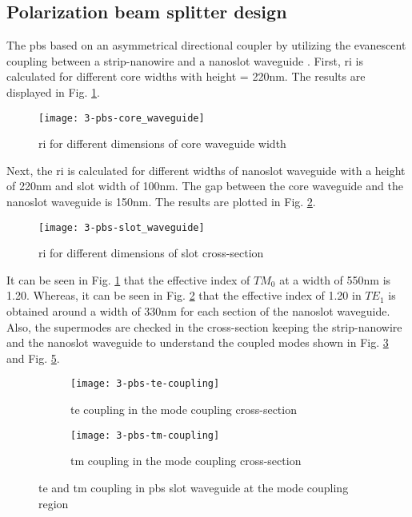 \documentclass[../report.tex]{subfiles}
\begin{document}
\subsection{Polarization beam splitter design}
The \gls{pbs} based on an asymmetrical directional coupler by utilizing the evanescent coupling between a strip-nanowire and a nanoslot waveguide \cite{pbs_dai_2011}. First, \gls{ri} is calculated for different core widths with height = 220nm. The results are displayed in Fig. \ref{fig:3_pbs_core_waveguide}.
\begin{figure}[H] %
	\centering
	\texttt{[image: 3-pbs-core\_waveguide]}
	\caption{\gls{ri} for different dimensions of core waveguide width}
	\label{fig:3_pbs_core_waveguide}
\end{figure}
\noindent Next, the \gls{ri} is calculated for different widths of nanoslot waveguide with a height of 220nm and slot width of 100nm. The gap between the core waveguide and the nanoslot waveguide is 150nm. The results are plotted in Fig. \ref{fig:3_pbs_slot_waveguide}.
\begin{figure}[H] %
	\centering
	\texttt{[image: 3-pbs-slot\_waveguide]}
	\caption{\gls{ri} for different dimensions of slot cross-section}
	\label{fig:3_pbs_slot_waveguide}
\end{figure}
\noindent It can be seen in Fig. \ref{fig:3_pbs_core_waveguide} that the effective index of $TM_0$ at a width of 550nm is 1.20. Whereas, it can be seen in Fig. \ref{fig:3_pbs_slot_waveguide} that the effective index of 1.20 in $TE_1$ is obtained around a width of 330nm for each section of the nanoslot waveguide. Also, the supermodes are checked in the cross-section keeping the strip-nanowire and the nanoslot waveguide to understand the coupled modes shown in Fig. \ref{fig:3_pbs_te_coupling} and Fig. \ref{fig:3_pbs_tm_coupling}.
\begin{figure}[H] %
	\begin{subfigure}[t]{0.45\textwidth}
		\texttt{[image: 3-pbs-te-coupling]}
		\caption{\gls{te} coupling in the mode coupling cross-section}
		\label{fig:3_pbs_te_coupling}
	\end{subfigure}
	\hfill
	\begin{subfigure}[t]{0.45\textwidth}
		\texttt{[image: 3-pbs-tm-coupling]}
		\caption{\gls{tm} coupling in the mode coupling cross-section}
		\label{fig:3_pbs_tm_coupling}
	\end{subfigure}
	\caption{\gls{te} and \gls{tm} coupling in \gls{pbs} slot waveguide at the mode coupling region}
\end{figure}
\end{document}
